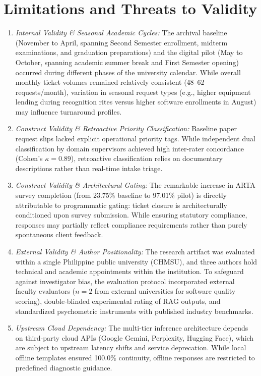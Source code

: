 \documentclass[conference]{IEEEtran}
\begin{document}
\section{Limitations and Threats to Validity}
\begin{enumerate}
    \item \textit{Internal Validity \& Seasonal Academic Cycles:} The archival baseline (November to April, spanning Second Semester enrollment, midterm examinations, and graduation preparations) and the digital pilot (May to October, spanning academic summer break and First Semester opening) occurred during different phases of the university calendar. While overall monthly ticket volumes remained relatively consistent (48–62 requests/month), variation in seasonal request types (e.g., higher equipment lending during recognition rites versus higher software enrollments in August) may influence turnaround profiles.
    \item \textit{Construct Validity \& Retroactive Priority Classification:} Baseline paper request slips lacked explicit operational priority tags. While independent dual classification by domain supervisors achieved high inter-rater concordance (Cohen's $\kappa = 0.89$), retroactive classification relies on documentary descriptions rather than real-time intake triage.
    \item \textit{Construct Validity \& Architectural Gating:} The remarkable increase in ARTA survey completion (from 23.75\% baseline to 97.01\% pilot) is directly attributable to programmatic gating: ticket closure is architecturally conditioned upon survey submission. While ensuring statutory compliance, responses may partially reflect compliance requirements rather than purely spontaneous client feedback.
    \item \textit{External Validity \& Author Positionality:} The research artifact was evaluated within a single Philippine public university (CHMSU), and three authors hold technical and academic appointments within the institution. To safeguard against investigator bias, the evaluation protocol incorporated external faculty evaluators ($n = 2$ from external universities for software quality scoring), double-blinded experimental rating of RAG outputs, and standardized psychometric instruments with published industry benchmarks.
    \item \textit{Upstream Cloud Dependency:} The multi-tier inference architecture depends on third-party cloud APIs (Google Gemini, Perplexity, Hugging Face), which are subject to upstream latency shifts and service deprecation. While local offline templates ensured 100.0\% continuity, offline responses are restricted to predefined diagnostic guidance.
\end{enumerate}
\end{document}
